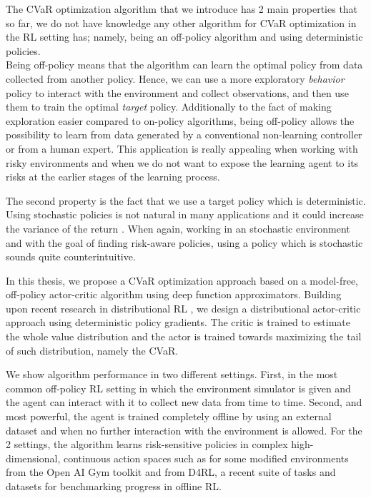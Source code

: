 The CVaR optimization algorithm that we introduce has 2 main properties that so far, we do not have
knowledge any other algorithm for CVaR optimization in the RL setting has; namely,
being an off-policy algorithm and using deterministic policies.\\
Being off-policy means that the algorithm can learn the optimal policy from data collected
from another policy. Hence, we can use a more exploratory \textit{behavior} policy to interact
with the environment and collect observations, and then use them to train
the optimal \textit{target} policy. 
Additionally to the fact of making exploration easier compared to on-policy algorithms,
being off-policy allows the possibility to learn from data generated by a conventional non-learning controller
or from a human expert.
This application is really appealing when working with risky environments and when we do not want to 
expose the learning agent to its risks at the earlier stages of the learning process.


The second property is the fact that we use a target policy which is deterministic.
Using stochastic policies is not natural in many applications and it could increase the variance
of the return .
When again, working in an stochastic 
environment and with the goal of finding risk-aware policies, using a policy which is stochastic 
sounds quite counterintuitive.

In this thesis, we propose a CVaR optimization approach based on a model-free, off-policy
actor-critic algorithm using deep function approximators. 
Building upon recent research in distributional RL \citep{Dabney2018b}, we design a distributional actor-critic approach
using deterministic policy gradients. The critic is trained to estimate the whole value distribution
and the actor is trained towards maximizing the tail of such distribution, namely the CVaR.

We show algorithm performance in two different settings.
First, in the most common off-policy RL setting in which the environment simulator is given and
the agent can interact with it to collect new data from time to time.
Second, and most powerful, the agent is trained completely offline by using an external
dataset and when no further interaction with the environment is allowed.
For the 2 settings, the algorithm learns risk-sensitive policies in
complex high-dimensional, continuous action spaces
such as for some modified environments from the Open AI Gym toolkit and from D4RL,
a recent suite of tasks and datasets for benchmarking progress in offline RL.








